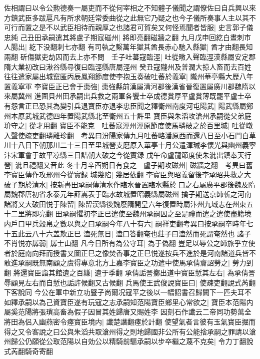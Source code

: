 佐相謂曰以令公勲德奏一屬吏而不從何宰相之不知體子儀聞之謂僚佐曰自兵興以來方鎮武臣多跋扈凡有所求朝廷常委曲從之此無它乃疑之也今子儀所奏事人主以其不可行而置之是不以武臣相待而親厚之也諸君可賀矣又何怪焉聞者皆服|{
	史言郭子儀忠純}
己丑田承嗣遣其將盧子期寇磁州|{
	將即亮翻磁牆之翻}
九月戊申回紇白晝刺市人腸出|{
	紇下没翻刺七亦翻}
有司執之繫萬年獄其酋長赤心馳入縣獄|{
	酋才由翻長知兩翻}
斫傷獄吏劫囚而去上亦不問　壬子吐蕃寇臨涇|{
	吐從暾入聲臨涇漢縣屬安定郡隋大業初改曰湫谷縣尋復曰臨涇縣唐屬涇州}
癸丑寇隴州及普潤大掠人畜而去百姓往往遣家屬出城竄匿丙辰鳳翔節度使李抱玉奏破吐蕃於義寧|{
	隴州華亭縣大歷八年置義寧軍}
李寶臣正已會于棗強|{
	棗強縣前漢屬清河郡後漢省晉復置屬廣川郡魏隋以來屬冀州}
進圍貝州田承嗣出兵救之兩軍各饗士卒成德賞厚平盧賞薄既罷平盧士卒有怨言正已恐其為變引兵退寶臣亦退李忠臣聞之釋衛州南度河屯陽武|{
	陽武縣屬鄭州本原武城武德四年置陽武縣北至衛州五十許里}
寶臣與朱滔攻滄州承嗣從父弟庭玠守之|{
	從才用翻}
寶臣不能克　吐蕃寇涇州涇原節度使馬璘破之於百里城|{
	吐從暾入聲使疏吏翻璘離珍翻　考異曰汾陽家傳九月吐蕃略潘原西而還八日至小石門白草川十八日下朝那川二十三日至里城營支磨原入華亭十月公遣渾瑊李懷光與幽州義寧汴宋軍會于故平凉縣三日詰朝大破之今從實録}
戊午命盧龍節度使朱泚出鎮奉天行營|{
	泚且禮翻又音此}
冬十月辛酉朔日有食之　盧子期攻磁州|{
	磁牆之翻　考異曰舊李寶臣傳作攻邢州今從實録}
城幾陷|{
	幾居依翻}
李寶臣與昭義留後李承昭共救之大破子期於清水|{
	按新書田承嗣傳清水作臨水晉置臨水縣於口之右屬廣平郡後魏及隋屬魏郡唐初省永泰元年薛嵩表于臨水故城置昭義縣屬磁州}
擒子期送京師斬之河南諸將又大破田悦于陳留|{
	陳留漢縣後魏廢隋開皇六年復置時屬汴州九域志在州東五十二里將即亮翻}
田承嗣懼初李正已遣使至魏州承嗣囚之至是禮而遣之遣使盡籍境内戶口甲兵穀帛之數以與之曰承嗣今年八十有六|{
	嗣祥吏翻考異曰按承嗣卒時年七十五此云八十六盖欺正巳}
溘死無日|{
	溘口答翻奄也莊子曰溘然而死謂奄然也}
諸子不肖悦亦孱弱|{
	孱士山翻}
凡今日所有為公守耳|{
	為于偽翻}
豈足以辱公之師旅乎立使者於庭南向拜而授書又圖正巳之像焚香事之正巳悦遂按兵不進於是河南諸道兵皆不敢進承嗣既無南顧之虞得專意北方上嘉李寶臣之功遣中使馬承倩齎詔勞之|{
	勞力到翻}
將還寶臣詣其館遺之百縑|{
	遺于季翻}
承倩詬詈擲出道中寶臣慙其左右|{
	為承倩詈辱顧見左右而自慙也詬許候翻又古候翻}
兵馬使王武俊說寶臣曰|{
	使疎吏翻說式芮翻下客說同}
今公在軍中新立功豎子尚爾况寇平之後以一幅詔書召歸闕下一匹夫耳不如釋承嗣以為己資寶臣遂有玩寇之志承嗣知范陽寶臣鄉里心常欲之|{
	寶臣本范陽内屬奚范陽將張瑣高畜為假子因冒其姓歸唐又賜姓李}
因刻石作䜟云二帝同功勢萬全將田為侣入幽燕密令瘞寶臣境内|{
	䜟楚譖翻瘞於計翻}
使望氣者言彼有玉氣寶臣掘而得之又令客說之曰公與朱滔共取滄州得之則地歸國非公所有公能捨承嗣之罪請以滄州歸公仍願從公取范陽以自効公以精騎前驅承嗣以步卒繼之蔑不克矣|{
	令力丁翻說式芮翻騎奇寄翻}
